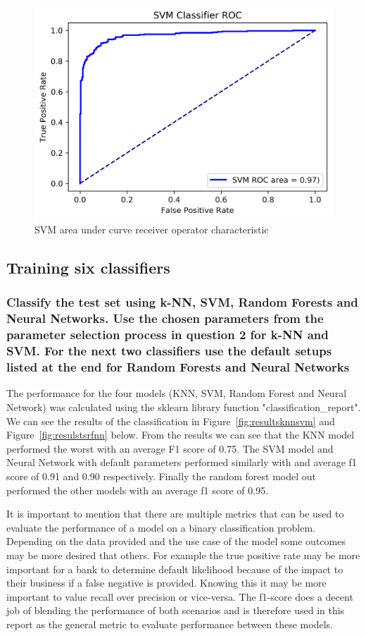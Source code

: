 \begin{figure}[!ht]
 \centering
\includegraphics[width=6.1in]{assignment2/2-2-b-svm.png}
\caption{\label{fig:svmtuning} SVM area under curve receiver operator characteristic}
\end{figure}


\subsection{Training six classifiers}

\subsubsection{Classify the test set using k-NN, SVM, Random Forests and Neural Networks. Use the chosen parameters from the parameter selection process in question 2 for k-NN and SVM. For the next two classifiers use the default setups listed at the end for Random Forests and Neural Networks}


The performance for the four models (KNN, SVM, Random Forest and Neural Network) was calculated using the sklearn library function "classification\_report". We can see the results of the classification in Figure~\ref{fig:resultsknnsvm} and Figure~\ref{fig:resulstsrfnn} below. From the results we can see that the KNN model performed the worst with an average F1 score of 0.75. The SVM model and Neural Network with default parameters performed similarly with and average f1 score of 0.91 and 0.90 respectively. Finally the random forest model out performed the other models with an average f1 score of 0.95.

It is important to mention that there are multiple metrics that can be used to evaluate the performance of a model on a binary classification problem. Depending on the data provided and the use case of the model some outcomes may be more desired that others. For example the true positive rate may be more important for a bank to determine default likelihood because of the impact to their business if a false negative is provided. Knowing this it may be more important to value recall over precision or vice-versa. The f1-score does a decent job of blending the performance of both scenarios and is therefore used in this report as the general metric to evaluate performance between these models.

